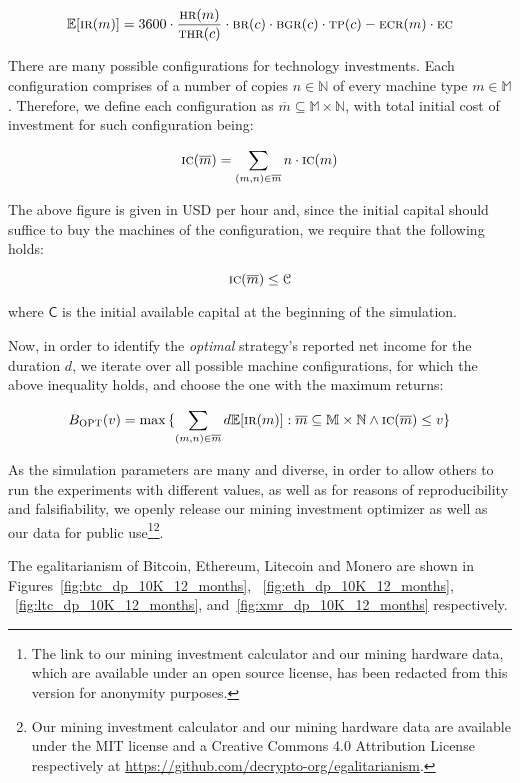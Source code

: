 \[
\mathbb{E}[\textsc{ir}(m)] = 3600 \cdot \frac{\textsc{hr}(m)}{\textsc{thr}(c)} \cdot \textsc{br}(c) \cdot \textsc{bgr}(c) \cdot \textsc{tp}(c) - \textsc{ecr}(m) \cdot \textsc{ec}
\]

There are many possible configurations for technology investments. Each
configuration comprises of a number of copies $n \in \mathbb{N}$ of every
machine type $m \in \mathbb{M}$. Therefore, we define each configuration as
$\overline{m} \subseteq \mathbb{M} \times \mathbb{N}$, with
total initial cost of investment for such configuration being:

\[
  \textsc{ic}(\overline{m}) = \sum_{(m, n) \in \overline{m}}{n \cdot \textsc{ic}(m)}
\]

The above figure is given in USD per hour and, since the initial capital should
suffice to buy the machines of the configuration, we require that the following
holds:

\[
    \textsc{ic}(\overline{m}) \leq \mathcal{C}
\]

where $\mathsf{C}$ is the initial available capital at the beginning of the simulation.

Now, in order to identify the \emph{optimal} strategy's reported net income for the
duration $d$, we iterate over all possible machine configurations, for which
the above inequality holds, and choose the one with the maximum returns:

\[
  B_\textsc{OPT}(v)
  =
  \max{
    \{
      \sum_{(m, n) \in \overline{m}}
      {d\mathbb{E}[\textsc{ir}(m)]}:
      \overline{m} \subseteq \mathbb{M} \times \mathbb{N}
      \land
      \textsc{ic}(\overline{m}) \leq v
    \}
  }
\]

As the simulation parameters are many and diverse, in order to allow others to
run the experiments with different values, as well as for reasons of
reproducibility and falsifiability, we openly release our mining investment
optimizer as well as our data for public use\ifanonymous\footnote{
  The link to our mining investment calculator and our mining hardware data,
  which are available under an open source license, has been redacted from this
  version for anonymity purposes.
}\else\footnote{
  Our mining investment calculator and our mining hardware data are available
  under the MIT license and a Creative Commons 4.0 Attribution License
  respectively at \url{https://github.com/decrypto-org/egalitarianism}.
}\fi.

The egalitarianism of Bitcoin, Ethereum, Litecoin and Monero are shown in
Figures~\ref{fig:btc_dp_10K_12_months}, ~\ref{fig:eth_dp_10K_12_months},
~\ref{fig:ltc_dp_10K_12_months}, and~\ref{fig:xmr_dp_10K_12_months}
respectively.

